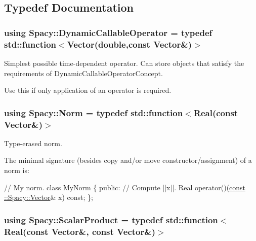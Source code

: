 \subsection{Typedef Documentation}
\hypertarget{namespaceSpacy_ad81a1e86d95b7d87a67d152fc01ee83e}{}
\subsubsection[{Dynamic\+Callable\+Operator}]{\setlength{\rightskip}{0pt plus 5cm}using {\bf Spacy\+::\+Dynamic\+Callable\+Operator} = typedef std\+::function$<${\bf Vector}(double,const {\bf Vector}\&)$>$}\label{namespaceSpacy_ad81a1e86d95b7d87a67d152fc01ee83e}


Simplest possible time-\/dependent operator. Can store objects that satisfy the requirements of Dynamic\+Callable\+Operator\+Concept. 

\label{namespaceSpacy_DynamicCallableOperatorAnchor}%
\hypertarget{namespaceSpacy_DynamicCallableOperatorAnchor}{}%
Use this if only application of an operator is required. \hypertarget{namespaceSpacy_a0dbe77a4e1282ef88017e94d50d17791}{}
\subsubsection[{Norm}]{\setlength{\rightskip}{0pt plus 5cm}using {\bf Spacy\+::\+Norm} = typedef std\+::function$<${\bf Real}(const {\bf Vector}\&)$>$}\label{namespaceSpacy_a0dbe77a4e1282ef88017e94d50d17791}


Type-\/erased norm. 

The minimal signature (besides copy and/or move constructor/assignment) of a norm is\+: 
\begin{DoxyCode}
\textcolor{comment}{// My norm.}
\textcolor{keyword}{class }MyNorm
\{
\textcolor{keyword}{public}:
  \textcolor{comment}{// Compute ||x||.}
  Real operator()(\hyperlink{group__VectorSpaceGroup_gafda42fd5aa3f7597a42b9831bf4dfd07}{const ::Spacy::Vector}& x) \textcolor{keyword}{const};
\};
\end{DoxyCode}
 \hypertarget{namespaceSpacy_aa995526aa0e3fa58aca8dd6772311cad}{}
\subsubsection[{Scalar\+Product}]{\setlength{\rightskip}{0pt plus 5cm}using {\bf Spacy\+::\+Scalar\+Product} = typedef std\+::function$<${\bf Real}(const {\bf Vector}\&, const {\bf Vector}\&)$>$}\label{namespaceSpacy_aa995526aa0e3fa58aca8dd6772311cad}


